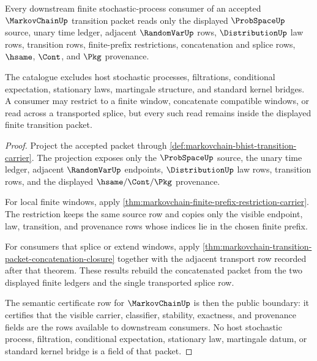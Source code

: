 \begin{theorem}
\label{thm:markovchain-filtered-transition-consumer-catalogue}
Every downstream finite stochastic-process consumer of an accepted
$\MarkovChainUp$ transition packet reads only the displayed $\ProbSpaceUp$
source, unary time ledger, adjacent $\RandomVarUp$ rows, $\DistributionUp$ law
rows, transition rows, finite-prefix restrictions, concatenation and splice
rows, $\hsame$, $\Cont$, and $\Pkg$ provenance.

The catalogue excludes host stochastic processes, filtrations, conditional
expectation, stationary laws, martingale structure, and standard kernel
bridges. A consumer may restrict to a finite window, concatenate compatible
windows, or read across a transported splice, but every such read remains inside
the displayed finite transition packet.
\end{theorem}
\begin{proof}
Project the accepted packet through
\autoref{def:markovchain-bhist-transition-carrier}. The projection exposes only
the $\ProbSpaceUp$ source, the unary time ledger, adjacent $\RandomVarUp$
endpoints, $\DistributionUp$ law rows, transition rows, and the displayed
$\hsame/\Cont/\Pkg$ provenance.

For local finite windows, apply
\autoref{thm:markovchain-finite-prefix-restriction-carrier}. The restriction
keeps the same source row and copies only the visible endpoint, law,
transition, and provenance rows whose indices lie in the chosen finite prefix.

For consumers that splice or extend windows, apply
\autoref{thm:markovchain-transition-packet-concatenation-closure} together with
the adjacent transport row recorded after that theorem. These results rebuild
the concatenated packet from the two displayed finite ledgers and the single
transported splice row.

The semantic certificate row for
$\MarkovChainUp$ is then the public boundary: it certifies that the visible
carrier, classifier, stability, exactness, and provenance fields are the rows
available to downstream consumers. No host stochastic process, filtration,
conditional expectation, stationary law, martingale datum, or standard kernel
bridge is a field of that packet.
\end{proof}

